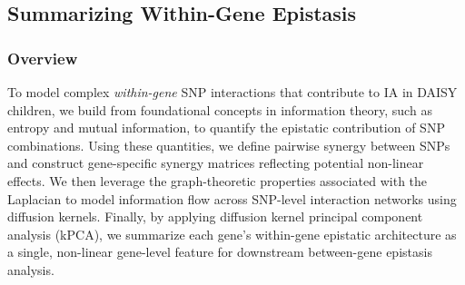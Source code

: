 \documentclass{article}\usepackage[]{graphicx}\usepackage[]{color}
\begin{document}
\subsection{Summarizing Within-Gene Epistasis}
\label{sec:sum-within}
\subsubsection{Overview}
To model complex \textit{within-gene} SNP interactions that contribute to IA in DAISY children, we build from foundational concepts in information theory, such as entropy and mutual information, to quantify the epistatic contribution of SNP combinations. Using these quantities, we define pairwise synergy between SNPs and construct gene-specific synergy matrices reflecting potential non-linear effects. We then leverage the graph-theoretic properties associated with the Laplacian to model information flow across SNP-level interaction networks using diffusion kernels. Finally, by applying diffusion kernel principal component analysis (kPCA), we summarize each gene’s within-gene epistatic architecture as a single, non-linear gene-level feature for downstream between-gene epistasis analysis.
\end{document}
